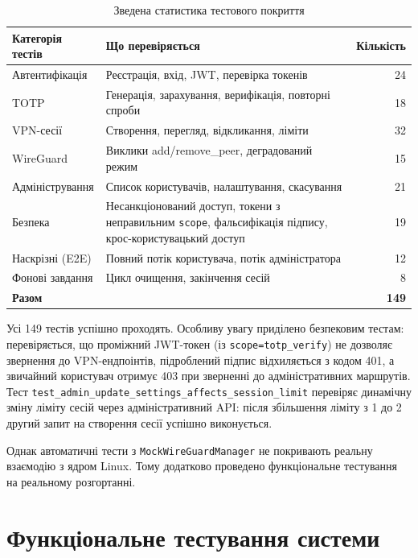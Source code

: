 \begin{table}[htbp]
\caption{Зведена статистика тестового покриття}
\label{tab:test_summary}
\begin{tabularx}{\textwidth}{|l|X|r|}
\hline
\textbf{Категорія тестів} & \textbf{Що перевіряється} & \textbf{Кількість} \\
\hline
Автентифікація & Реєстрація, вхід, JWT, перевірка токенів & 24 \\
\hline
TOTP & Генерація, зарахування, верифікація, повторні спроби & 18 \\
\hline
VPN-сесії & Створення, перегляд, відкликання, ліміти & 32 \\
\hline
WireGuard & Виклики add/remove\_peer, деградований режим & 15 \\
\hline
Адміністрування & Список користувачів, налаштування, скасування & 21 \\
\hline
Безпека & Несанкціонований доступ, токени з неправильним \texttt{scope},
          фальсифікація підпису, крос-користувацький доступ & 19 \\
\hline
Наскрізні (E2E) & Повний потік користувача, потік адміністратора & 12 \\
\hline
Фонові завдання & Цикл очищення, закінчення сесій & 8 \\
\hline
\textbf{Разом} & & \textbf{149} \\
\hline
\end{tabularx}
\end{table}

Усі 149 тестів успішно проходять. Особливу увагу приділено безпековим
тестам: перевіряється, що проміжний JWT-токен (із \texttt{scope=totp\_verify})
не дозволяє звернення до VPN-ендпоінтів, підроблений підпис відхиляється
з кодом 401, а звичайний користувач отримує 403 при зверненні до
адміністративних маршрутів. Тест \texttt{test\_admin\_update\_settings\_affects\_session\_limit}
перевіряє динамічну зміну ліміту сесій через адміністративний API:
після збільшення ліміту з 1 до 2 другий запит на створення сесії
успішно виконується.

Однак автоматичні тести з \texttt{MockWireGuardManager} не покривають
реальну взаємодію з ядром Linux. Тому додатково проведено функціональне
тестування на реальному розгортанні.

\section{Функціональне тестування системи}
\label{sec:functional_testing}

